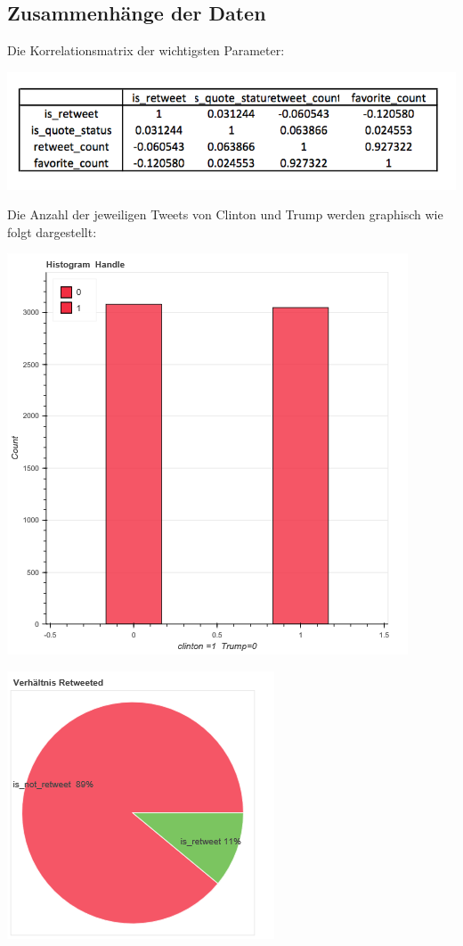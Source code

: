 \documentclass[12pt]{article}
\begin{document}
\subsection*{Zusammenhänge der Daten}


Die Korrelationsmatrix der wichtigsten Parameter:

\centerline{\includegraphics[scale=0.5]{img/marix.png} }

Die Anzahl der jeweiligen Tweets von Clinton und Trump werden graphisch wie folgt dargestellt:

\centerline{\includegraphics[scale=0.6]{img/histo_X.png} }


\centerline{\includegraphics[scale=0.8]{img/pie_XX.png}}
\end{document}
